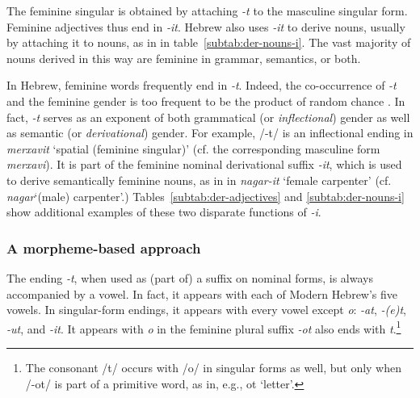 

The feminine singular is obtained by attaching \textit{-t} to the masculine singular
form. Feminine adjectives thus end in \textit{-it}. 
Hebrew also uses \textit{-it} to derive nouns, usually by attaching it 
to nouns, as in in table~\ref{subtab:der-nouns-i}. 
The vast majority of nouns derived in this way are feminine in 
grammar, semantics, or both. 

In Hebrew, feminine words frequently 
end in \textit{-t}. Indeed, the co-occurrence of \textit{-t} and the feminine gender is 
too frequent to be the product of random chance \citep{faust:2013}.
In fact, \textit{-t} serves as an exponent of both grammatical (or \emph{inflectional}) 
gender as well as semantic (or \emph{derivational}) gender. For example, /-t/ 
is an inflectional ending in \textit{merxavit} `spatial (feminine singular)' 
(cf. the corresponding masculine form \textit{merxavi}). 
It is part of the feminine nominal derivational suffix \textit{-it}, which is used to 
derive semantically feminine nouns, as in in \textit{nagar-it} 
`female carpenter' (cf. \textit{nagar}`(male) carpenter'.) 
Tables~\ref{subtab:der-adjectives} and \ref{subtab:der-nouns-i} 
show additional
examples of these two disparate functions of \textit{-i}.

\subsubsection{A morpheme-based approach}
The ending \textit{-t}, when used as (part of) a suffix on 
nominal forms, is always accompanied by a vowel. 
In fact, it appears with each of Modern Hebrew's five vowels.
In singular-form endings, it appears with every vowel except 
\textit{o}: \textit{-at}, \textit{-(e)t}, \textit{-ut}, and \textit{-it}. 
It appears with \textit{o} in the feminine plural suffix \textit{-ot} 
also ends with \textit{t}.\footnote{The consonant /t/ occurs with 
/o/ in singular forms as well, but only when /-ot/ is part of a 
primitive word, as in, e.g., ot `letter'.}

